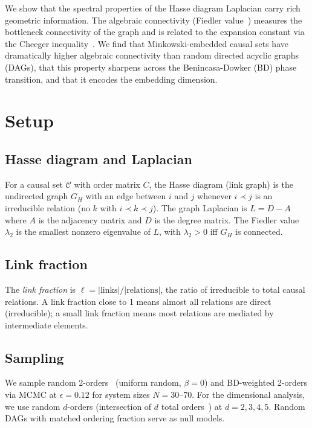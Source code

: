 \documentclass[aps,prd,twocolumn,superscriptaddress,nofootinbib]{revtex4-2}
\begin{document}
We show that the spectral properties of the Hasse diagram Laplacian carry rich geometric information. The algebraic connectivity (Fiedler value~\cite{fiedler1973}) measures the bottleneck connectivity of the graph and is related to the expansion constant via the Cheeger inequality~\cite{chung1997}. We find that Minkowski-embedded causal sets have dramatically higher algebraic connectivity than random directed acyclic graphs (DAGs), that this property sharpens across the Benincasa-Dowker (BD) phase transition, and that it encodes the embedding dimension.

\section{Setup}

\subsection{Hasse diagram and Laplacian}

For a causal set $\mathcal{C}$ with order matrix $C$, the Hasse diagram (link graph) is the undirected graph $G_H$ with an edge between $i$ and $j$ whenever $i \prec j$ is an irreducible relation (no $k$ with $i \prec k \prec j$). The graph Laplacian is $L = D - A$ where $A$ is the adjacency matrix and $D$ is the degree matrix. The Fiedler value $\lambda_2$ is the smallest nonzero eigenvalue of $L$, with $\lambda_2 > 0$ iff $G_H$ is connected.

\subsection{Link fraction}

The \emph{link fraction} is $\ell = |\text{links}| / |\text{relations}|$, the ratio of irreducible to total causal relations. A link fraction close to 1 means almost all relations are direct (irreducible); a small link fraction means most relations are mediated by intermediate elements.

\subsection{Sampling}

We sample random 2-orders~\cite{glaser2018} (uniform random, $\beta = 0$) and BD-weighted 2-orders via MCMC at $\epsilon = 0.12$ for system sizes $N = 30$--$70$. For the dimensional analysis, we use random $d$-orders (intersection of $d$ total orders~\cite{brightwell1991}) at $d = 2, 3, 4, 5$. Random DAGs with matched ordering fraction serve as null models.
\end{document}
